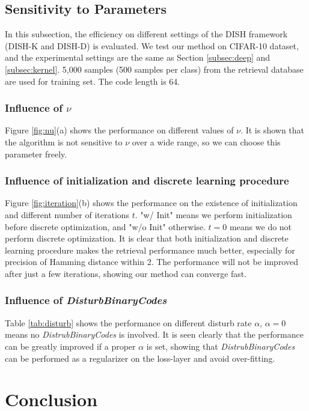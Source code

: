 \documentclass[conference]{IEEEtran}
\begin{document}
\subsection{Sensitivity to Parameters}
\label{subsec:discussion}

In this subsection, the efficiency on different settings of the DISH framework (DISH-K and DISH-D) is evaluated. We test our method on CIFAR-10 dataset, and the experimental settings are the same as Section \ref{subsec:deep} and \ref{subsec:kernel}. 5,000 samples (500 samples per class) from the retrieval database are used for training set. The code length is 64.

\subsubsection{Influence of $\nu$}
Figure \ref{fig:nu}(a) shows the performance on different values of $\nu$. It is shown that the algorithm is not sensitive to $\nu$ over a wide range, so we can choose this parameter freely.

\subsubsection{Influence of initialization and discrete learning procedure}
Figure \ref{fig:iteration}(b) shows the performance on the existence of initialization and different number of iterations $t$. "w/ Init" means we perform initialization before discrete optimization, and "w/o Init" otherwise. $t=0$ means we do not perform discrete optimization. It is clear that both initialization and discrete learning procedure makes the retrieval performance much better, especially for precision of Hamming distance within 2. The performance will not be improved after just a few iterations, showing our method can converge fast.

\subsubsection{Influence of {\em DisturbBinaryCodes}}

Table \ref{tab:disturb} shows the performance on different disturb rate $\alpha$, $\alpha=0$ means no {\em DistrubBinaryCodes} is involved. It is seen clearly that the performance can be greatly improved if a proper $\alpha$ is set, showing that {\em DistrubBinaryCodes} can be performed as a regularizer on the loss-layer and avoid over-fitting.

\section{Conclusion}
\label{sec:conclusion}
\end{document}
